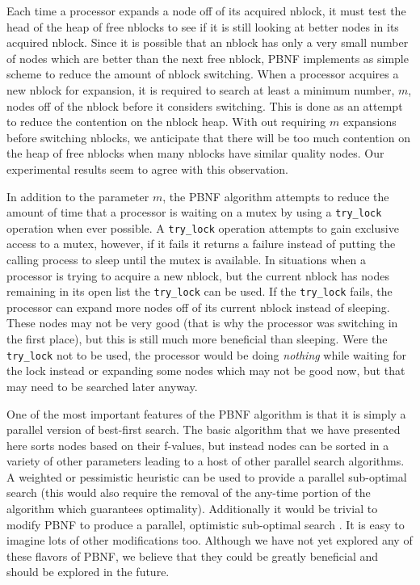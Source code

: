 \documentclass{article}
\begin{document}
Each time a processor expands a node off of its acquired nblock, it
must test the head of the heap of free nblocks to see if it is still
looking at better nodes in its acquired nblock.  Since it is possible
that an nblock has only a very small number of nodes which are better
than the next free nblock, PBNF implements as simple scheme to reduce
the amount of nblock switching.  When a processor acquires a new
nblock for expansion, it is required to search at least a minimum number,
$m$, nodes off of the nblock before it considers switching.  This is
done as an attempt to reduce the contention on the nblock heap.  With
out requiring $m$ expansions before switching nblocks, we anticipate
that there will be too much contention on the heap of free nblocks
when many nblocks have similar quality nodes.  Our experimental
results seem to agree with this observation.

In addition to the parameter $m$, the PBNF algorithm attempts to
reduce the amount of time that a processor is waiting on a mutex by
using a \texttt{try\_lock} operation when ever possible.  A
\texttt{try\_lock} operation attempts to gain exclusive access to a
mutex, however, if it fails it returns a failure instead of putting
the calling process to sleep until the mutex is available.  In
situations when a processor is trying to acquire a new nblock, but the
current nblock has nodes remaining in its open list the
\texttt{try\_lock} can be used.  If the \texttt{try\_lock} fails, the
processor can expand more nodes off of its current nblock instead of
sleeping.  These nodes may not be very good (that is why the processor
was switching in the first place), but this is still much more
beneficial than sleeping.  Were the \texttt{try\_lock} not to be used,
the processor would be doing \emph{nothing} while waiting for the lock
instead or expanding some nodes which may not be good now, but that
may need to be searched later anyway.

One of the most important features of the PBNF algorithm is that it is
simply a parallel version of best-first search.  The basic algorithm
that we have presented here sorts nodes based on their f-values, but
instead nodes can be sorted in a variety of other parameters leading
to a host of other parallel search algorithms.  A weighted or
pessimistic heuristic can be used to provide a parallel sub-optimal
search (this would also require the removal of the any-time portion of
the algorithm which guarantees optimality).  Additionally it would be
trivial to modify PBNF to produce a parallel, optimistic sub-optimal
search \cite{thayer:fas}.  It is easy to imagine lots of other
modifications too.  Although we have not yet explored any of these
flavors of PBNF, we believe that they could be greatly beneficial and
should be explored in the future.
\end{document}
